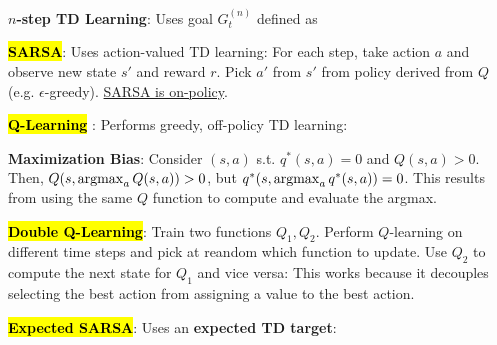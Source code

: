 \documentclass{article}
\begin{document}
  \textbf{$n$-step TD Learning}: Uses goal $G_t^{(n)}$ defined as

  \hl{\textbf{SARSA}}: Uses action-valued TD learning:
  For each step, take action $a$ and observe new state $s'$ and reward $r$. Pick $a'$ from $s'$ from policy derived from $Q$ (e.g. $\epsilon$-greedy). \underline{SARSA is on-policy}. 

  \hl{\textbf{Q-Learning}} \cite{watkins1992q}: Performs greedy, off-policy TD learning:

  \textbf{Maximization Bias}: Consider $(s,a)$ s.t. $q^*(s,a)=0$ and $Q(s,a)>0$. Then, $Q(s,\operatorname*{argmax}_a Q(s,a))>0$, but $q^*(s,\operatorname*{argmax}_a q^*(s,a))=0$. This results from using the same $Q$ function to compute and evaluate the argmax. 

  \hl{\textbf{Double Q-Learning}}: Train two functions $Q_1,Q_2$. Perform $Q$-learning on different time steps and pick at reandom which function to update. Use $Q_2$ to compute the next state for $Q_1$ and vice versa:
  This works because it decouples selecting the best action from assigning a value to the best action. 

  \hl{\textbf{Expected SARSA}}: Uses an \textbf{expected TD target}: 
\end{document}
